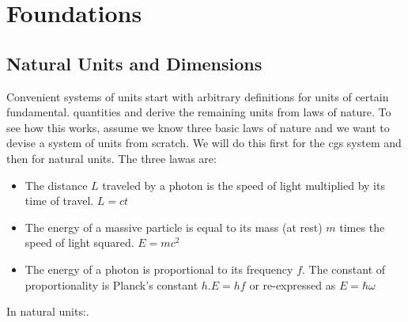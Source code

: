 \chapter{Foundations}
\section{Natural Units and Dimensions}
Convenient systems of units start with arbitrary definitions for units of certain fundamental. quantities and derive the remaining units from laws of nature. To see how this works, assume we know three basic laws of nature and we want to devise a system of units from scratch. We will do this first for the cgs system and then for natural units.
The three lawas are:
\begin{qt}
\begin{itemize}
    \item The distance $L$ traveled by a photon is the speed of light multiplied by its time of travel. $L=c t$
    \item The energy of a massive particle is equal to its mass (at rest) $m$ times the speed of light squared. $E=mc^2$
    \item The energy of a photon is proportional to its frequency $f$. The constant of proportionality is Planck's constant $h . E=h f$ or re-expressed as $E=\hbar \omega$
\end{itemize}
\end{qt}
In natural units:.

